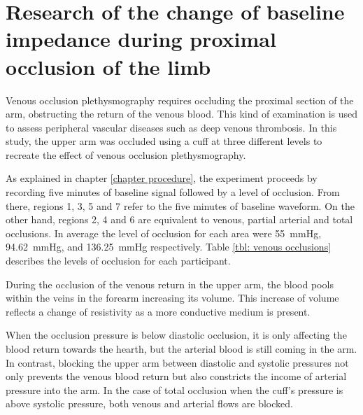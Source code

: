 
\chapter{Research of the change of baseline impedance during proximal occlusion of the limb}  %
\label{chapter occlusion}

\ifpdf
\graphicspath{{Chapter7/Figs/Raster/}{Chapter7/Figs/PDF/}{Chapter7/Figs/}}
\else
\graphicspath{{Chapter7/Figs/Vector/}{Chapter7/Figs/}}
\fi

Venous occlusion plethysmography requires occluding the proximal section of the arm, obstructing the return of the venous blood. This kind of examination is used to assess peripheral vascular diseases such as deep venous thrombosis.  In this study, the upper arm was occluded using a cuff at three different levels to recreate the effect of venous occlusion plethysmography.

As explained in chapter \ref{chapter procedure}, the experiment proceeds by recording five minutes of baseline signal followed by a level of occlusion. From there, regions 1, 3, 5 and 7 refer to the five minutes of baseline waveform. On the other hand, regions 2, 4 and 6 are equivalent to venous, partial arterial and total occlusions. In average the level of occlusion for each area were \SI{55}{\mmHg}, \SI{94.62}{\mmHg}, and  \SI{136.25}{\mmHg} respectively. Table  \ref{tbl: venous occlusions} describes the levels of occlusion for each participant. 

During the occlusion of the venous return in the upper arm, the blood pools within the veins in the forearm increasing its volume. This increase of volume reflects a change of resistivity as a more conductive medium is present. 

When the occlusion pressure is below diastolic occlusion, it is only affecting the blood return towards the hearth, but the arterial blood is still coming in the arm. In contrast, blocking the upper arm between diastolic and systolic pressures not only prevents the venous blood return but also constricts the income of arterial pressure into the arm. In the case of total occlusion when the cuff's pressure is above systolic pressure, both venous and arterial flows are blocked. 

